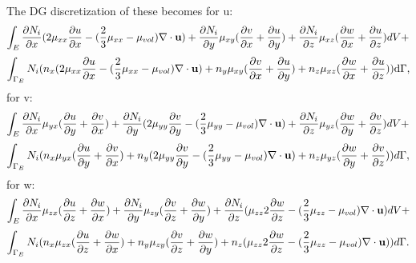 The DG discretization of these becomes 
for u:
\begin{equation}
\int_E 
\frac{\partial N_i}{\partial x} (2\mu_{xx}
\frac{\partial u}{\partial x}
-(\frac{2}{3}\mu_{xx}-\mu_{vol})\nabla\cdot{\bf u} 
)
+
\frac{\partial N_i}{\partial y} \mu_{xy}
(
\frac{\partial v}{\partial x}+\frac{\partial u}{\partial y})
+
\frac{\partial N_i}{\partial z} \mu_{xz}
(
\frac{\partial w}{\partial x}+\frac{\partial u}{\partial z})
 dV+
\label{visc-stress-u-Ni} 
\end{equation}
\begin{equation}
\int_{\Gamma_E} 
N_i (n_x (2\mu_{xx}
\frac{\partial u}{\partial x}
-(\frac{2}{3}\mu_{xx}-\mu_{vol})\nabla\cdot{\bf u} 
)
+
 {n_y} \mu_{xy}
(
\frac{\partial v}{\partial x}+\frac{\partial u}{\partial y})
+
{n_z} \mu_{xz}
(
\frac{\partial w}{\partial x}+\frac{\partial u}{\partial z})
 )\mathrm{d}\Gamma,
\label{visc-stress-u-n} 
\end{equation}
for v:
\begin{equation}
\int_E 
\frac{\partial N_i}{\partial x} \mu_{yx}
(
\frac{\partial u}{\partial y}+\frac{\partial v}{\partial x}
)
+
\frac{\partial N_i} {\partial y}(2\mu_{yy}
\frac{\partial v}{\partial y}
-(\frac{2}{3}\mu_{yy}-\mu_{vol})\nabla\cdot{\bf u} 
)
+
\frac{\partial N_i}{\partial z} \mu_{yz}
(
\frac{\partial w}{\partial y}+\frac{\partial v}{\partial z})
 dV+
\label{visc-stress-v-Ni} 
\end{equation}
\begin{equation}
\int_{\Gamma_E} 
N_i({n_x} \mu_{yx}
(
\frac{\partial u}{\partial y}+\frac{\partial v}{\partial x}
)
+
{n_y}(2\mu_{yy}
\frac{\partial v}{\partial y}
-(\frac{2}{3}\mu_{yy}-\mu_{vol})\nabla\cdot{\bf u} 
)
+
{n_z} \mu_{yz}
(
\frac{\partial w}{\partial y}+\frac{\partial v}{\partial z})
 )d\Gamma,
\label{visc-stress-v-n} 
\end{equation}
for w:
\begin{equation}
\int_E 
\frac{\partial N_i}{\partial x} \mu_{zx}
(
\frac{\partial u}{\partial z}+\frac{\partial w}{\partial x})
+
\frac{\partial N_i}{\partial y} \mu_{zy}
(
\frac{\partial v}{\partial z}+\frac{\partial w}{\partial y})
+
\frac{\partial N_i}{\partial z} (\mu_{zz}
2\frac{\partial w}{\partial z}
-(\frac{2}{3}\mu_{zz}-\mu_{vol})\nabla\cdot{\bf u} 
) dV  +
\label{visc-stress-w-Ni} 
\end{equation}
\begin{equation}
\int_{\Gamma_E} 
N_i ({n_x} \mu_{zx}
(
\frac{\partial u}{\partial z}+\frac{\partial w}{\partial x})
+
{n_y} \mu_{zy}
(
\frac{\partial v}{\partial z}+\frac{\partial w}{\partial y})
+
{n_z}  (\mu_{zz}
2\frac{\partial w}{\partial z}
-(\frac{2}{3}\mu_{zz}-\mu_{vol})\nabla\cdot{\bf u} 
)  )d\Gamma. 
\label{visc-stress-w-n} 
\end{equation}
